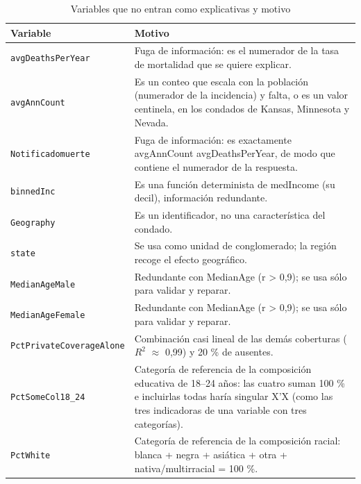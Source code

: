 \begin{table}[htbp]
\centering
\footnotesize
\caption{Variables que no entran como explicativas y motivo}\label{tab:excluidas}
\begin{tabularx}{\linewidth}{l >{\raggedright\arraybackslash}X}
\toprule
Variable & Motivo \\
\midrule
\texttt{avgDeathsPerYear} & Fuga de información: es el numerador de la tasa de mortalidad que se quiere explicar. \\
\texttt{avgAnnCount} & Es un conteo que escala con la población (numerador de la incidencia) y falta, o es un valor centinela, en los condados de Kansas, Minnesota y Nevada. \\
\texttt{Notificadomuerte} & Fuga de información: es exactamente avgAnnCount \textminus{} avgDeathsPerYear, de modo que contiene el numerador de la respuesta. \\
\texttt{binnedInc} & Es una función determinista de medIncome (su decil), información redundante. \\
\texttt{Geography} & Es un identificador, no una característica del condado. \\
\texttt{state} & Se usa como unidad de conglomerado; la región recoge el efecto geográfico. \\
\texttt{MedianAgeMale} & Redundante con MedianAge (r > 0,9); se usa sólo para validar y reparar. \\
\texttt{MedianAgeFemale} & Redundante con MedianAge (r > 0,9); se usa sólo para validar y reparar. \\
\texttt{PctPrivateCoverageAlone} & Combinación casi lineal de las demás coberturas ($R^2$ $\approx$ 0,99) y 20 \% de ausentes. \\
\texttt{PctSomeCol18\_24} & Categoría de referencia de la composición educativa de 18–24 años: las cuatro suman 100 \% e incluirlas todas haría singular X'X (como las tres indicadoras de una variable con tres categorías). \\
\texttt{PctWhite} & Categoría de referencia de la composición racial: blanca + negra + asiática + otra + nativa/multirracial = 100 \%. \\
\bottomrule
\end{tabularx}

\end{table}
